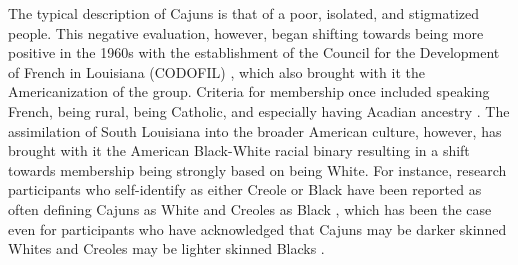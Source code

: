       The typical description of Cajuns is that of a poor, isolated, and stigmatized people.
      This negative evaluation, however, began shifting towards being more positive in the 1960s with the establishment of the Council for the Development of French in Louisiana (CODOFIL) \parencite[pp.~31-33]{brown_pronominal_1988}, which also brought with it the Americanization of the group.
      Criteria for membership once included speaking French, being rural, being Catholic, and especially having Acadian ancestry \parencite{johnson_louisiana_1976, neumann_creole_1985, smith_influence_1939}.
      The assimilation of South Louisiana into the broader American culture, however, has brought with it the American Black-White racial binary resulting in a shift towards membership being strongly based on being White.
      For instance, research participants who self-identify as either Creole or Black have been reported as often defining Cajuns as White and Creoles as Black \parencite[p.~34]{giancarlo_dont_2019}, which has been the case even for participants who have acknowledged that Cajuns may be darker skinned Whites and Creoles may be lighter skinned Blacks \parencite[Stanford, 2016, as cited in][p.~32]{giancarlo_dont_2019}.



